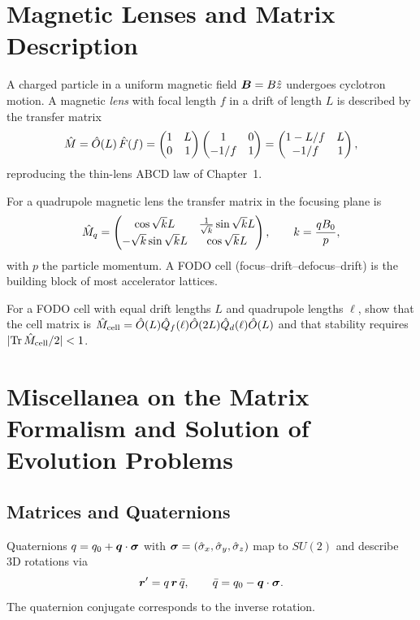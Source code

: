 \section{Magnetic Lenses and Matrix Description}

A charged particle in a uniform magnetic field $\bm{B} = B\hat z$ undergoes
cyclotron motion. A magnetic \emph{lens} with focal length $f$ in a drift of
length $L$ is described by the transfer matrix
\begin{equation}
\hat M = \hat O(L)\,\hat F(f) =
\begin{pmatrix}1&L\\0&1\end{pmatrix}\begin{pmatrix}1&0\\-1/f&1\end{pmatrix}
= \begin{pmatrix}1-L/f & L \\ -1/f & 1\end{pmatrix},
\label{eq:5.2.1}
\end{equation}
reproducing the thin-lens ABCD law of Chapter~1.

For a quadrupole magnetic lens the transfer matrix in the focusing plane is
\begin{equation}
\hat M_q = \begin{pmatrix}\cos\sqrt{k}L & \frac{1}{\sqrt{k}}\sin\sqrt{k}L
           \\ -\sqrt{k}\sin\sqrt{k}L & \cos\sqrt{k}L\end{pmatrix},
\qquad k = \frac{qB_0}{p},
\label{eq:5.2.2}
\end{equation}
with $p$ the particle momentum. A FODO cell (focus--drift--defocus--drift)
is the building block of most accelerator lattices.

\begin{exercise}
For a FODO cell with equal drift lengths $L$ and quadrupole lengths
$\ell$, show that the cell matrix is
$\hat M_{\rm cell}=\hat O(L)\hat Q_f(\ell)\hat O(2L)\hat Q_d(\ell)\hat O(L)$
and that stability requires $|{\rm Tr}\,\hat M_{\rm cell}/2|<1$.
\end{exercise}

\section{Miscellanea on the Matrix Formalism and Solution of Evolution Problems}

\subsection{Matrices and Quaternions}

Quaternions $q=q_0+\bm{q}\cdot\bm{\sigma}$ with $\bm{\sigma}=(\hat\sigma_x,\hat\sigma_y,\hat\sigma_z)$
map to $SU(2)$ and describe 3D rotations via
\begin{equation}
\bm{r}' = q\,\bm{r}\,\bar q, \qquad \bar q = q_0 - \bm{q}\cdot\bm{\sigma}.
\label{eq:5.3.1}
\end{equation}
The quaternion conjugate corresponds to the inverse rotation.

